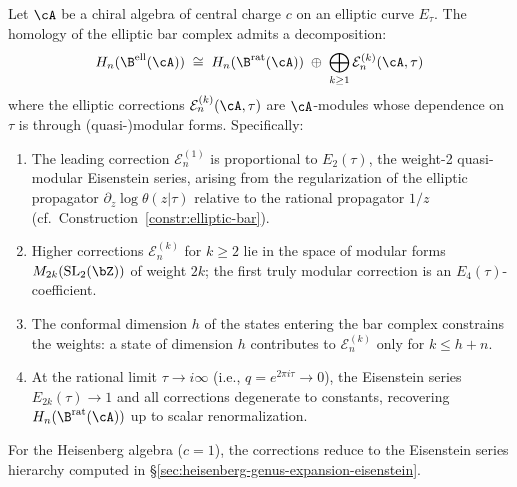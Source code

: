 \begin{theorem}\label{thm:elliptic-vs-rational}
Let $\cA$ be a chiral algebra of central charge $c$ on an elliptic curve $E_\tau$.
The homology of the elliptic bar complex admits a decomposition:
\[
H_n(\B^{\mathrm{ell}}(\cA)) \;\cong\; H_n(\B^{\mathrm{rat}}(\cA))
\;\oplus\; \bigoplus_{k \geq 1} \mathcal{E}^{(k)}_n(\cA, \tau)
\]
where the elliptic corrections $\mathcal{E}^{(k)}_n(\cA, \tau)$
are $\cA$-modules whose dependence on $\tau$ is through
(quasi-)modular forms. Specifically:
\begin{enumerate}[label=(\roman*)]
\item The leading correction $\mathcal{E}^{(1)}_n$ is
proportional to $E_2(\tau)$, the weight-2 quasi-modular
Eisenstein series, arising from the regularization of
the elliptic propagator $\partial_z \log\theta(z|\tau)$
relative to the rational propagator $1/z$
(cf.\ Construction~\ref{constr:elliptic-bar}).
\item Higher corrections $\mathcal{E}^{(k)}_n$ for $k \geq 2$
lie in the space of modular forms $M_{2k}(\mathrm{SL}_2(\bZ))$
of weight $2k$; the first truly modular correction is an
$E_4(\tau)$-coefficient.
\item The conformal dimension $h$ of the states entering the
bar complex constrains the weights: a state of dimension $h$
contributes to $\mathcal{E}^{(k)}_n$ only for $k \leq h + n$.
\item At the rational limit $\tau \to i\infty$ (i.e., $q = e^{2\pi i\tau} \to 0$),
the Eisenstein series $E_{2k}(\tau) \to 1$ and all corrections
degenerate to constants, recovering
$H_n(\B^{\mathrm{rat}}(\cA))$ up to scalar renormalization.
\end{enumerate}
For the Heisenberg algebra ($c = 1$), the corrections reduce to the
Eisenstein series hierarchy computed in
\S\ref{sec:heisenberg-genus-expansion-eisenstein}.
\end{theorem}


